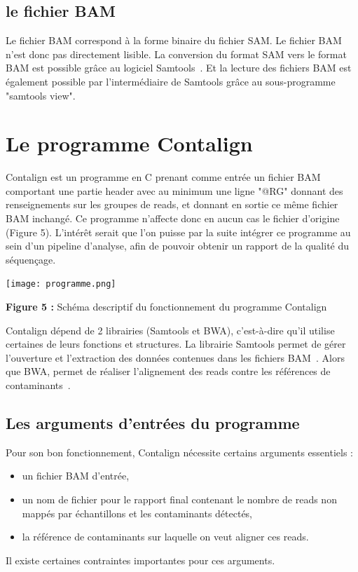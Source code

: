 \documentclass[a4paper,12pt]{article}
\begin{document}
\subsection{le fichier BAM}
Le fichier BAM correspond à la forme binaire du fichier SAM. Le fichier BAM n'est donc pas directement lisible. La conversion du format SAM vers le format BAM est possible grâce au logiciel Samtools~\cite{SAM2}. Et la lecture des fichiers BAM est également possible par l'intermédiaire de Samtools grâce au sous-programme "samtools view". 
 \\
\section{Le programme Contalign}
Contalign est un programme en C prenant comme entrée un fichier BAM comportant une partie header avec au minimum une ligne "@RG" donnant des renseignements sur les groupes de reads, et donnant en sortie ce même fichier BAM inchangé. Ce programme n'affecte donc en aucun cas le fichier d'origine (Figure 5). L'intérêt serait que l'on puisse par la suite intégrer ce programme au sein d'un pipeline d'analyse, afin de pouvoir obtenir un rapport de la qualité du séquençage. 
 
\begin{center}
\texttt{[image: programme.png]}~
\end{center}
\begin{center}
\textbf{ Figure 5 : }Schéma descriptif du fonctionnement du programme Contalign
\end{center}
Contalign dépend de 2 librairies (Samtools et BWA), c'est-à-dire qu'il utilise certaines de leurs fonctions et structures. La librairie Samtools permet de gérer l'ouverture et l'extraction des données contenues dans les fichiers BAM~\cite{SAM}. Alors que BWA, permet de réaliser l'alignement des reads contre les références de contaminants~\cite{BWA}. 
\\
\subsection{Les arguments d'entrées du programme}

Pour son bon fonctionnement, Contalign nécessite certains arguments essentiels : 
\begin{itemize}
\item un fichier BAM d'entrée, 
\item un nom de fichier pour le rapport final contenant le nombre de reads non mappés par échantillons et les contaminants détectés, 
\item la référence de contaminants sur laquelle on veut aligner ces reads.
\end{itemize}
Il existe certaines contraintes importantes pour ces arguments. \\
\end{document}
